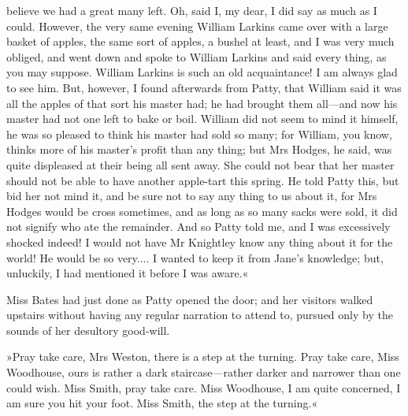 believe we had a great many left. Oh, said I, my dear, I did say as much as I could. However, the very same evening William Larkins came over with a large basket of apples, the same sort of apples, a bushel at least, and I was very much obliged, and went down and spoke to William Larkins and said every thing, as you may suppose. William Larkins is such an old acquaintance! I am always glad to see him. But, however, I found afterwards from Patty, that William said it was all the apples of that sort his master had; he had brought them all—and now his master had not one left to bake or boil. William did not seem to mind it himself, he was so pleased to think his master had sold so many; for William, you know, thinks more of his master's profit than any thing; but Mrs Hodges, he said, was quite displeased at their being all sent away. She could not bear that her master should not be able to have another apple-tart this spring. He told Patty this, but bid her not mind it, and be sure not to say any thing to us about it, for Mrs Hodges would be cross sometimes, and as long as so many sacks were sold, it did not signify who ate the remainder. And so Patty told me, and I was excessively shocked indeed! I would not have Mr Knightley know any thing about it for the world! He would be so very.... I wanted to keep it from Jane's knowledge; but, unluckily, I had mentioned it before I was aware.«

Miss Bates had just done as Patty opened the door; and her visitors walked upstairs without having any regular narration to attend to, pursued only by the sounds of her desultory good-will.

»Pray take care, Mrs Weston, there is a step at the turning. Pray take care, Miss Woodhouse, ours is rather a dark staircase—rather darker and narrower than one could wish. Miss Smith, pray take care. Miss Woodhouse, I am quite concerned, I am sure you hit your foot. Miss Smith, the step at the turning.«